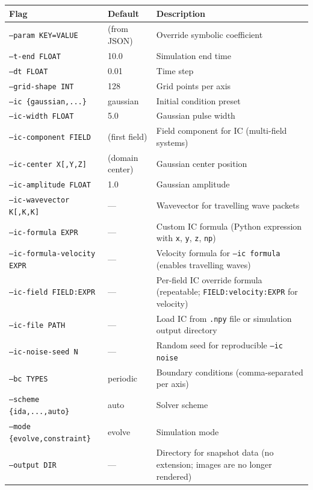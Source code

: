 \begin{table}[htbp]
\centering
\begin{tabular}{@{}llp{4.5cm}@{}}
\toprule
Flag & Default & Description \\
\midrule
\texttt{--param KEY=VALUE}          & (from JSON)       & Override symbolic coefficient \\
\texttt{--t-end FLOAT}             & 10.0              & Simulation end time \\
\texttt{--dt FLOAT}                & 0.01              & Time step \\
\texttt{--grid-shape INT}          & 128               & Grid points per axis \\
\texttt{--ic \{gaussian,...\}}      & gaussian          & Initial condition preset \\
\texttt{--ic-width FLOAT}          & 5.0               & Gaussian pulse width \\
\texttt{--ic-component FIELD}      & (first field)     & Field component for IC (multi-field systems) \\
\texttt{--ic-center X[,Y,Z]}      & (domain center)   & Gaussian center position \\
\texttt{--ic-amplitude FLOAT}      & 1.0               & Gaussian amplitude \\
\texttt{--ic-wavevector K[,K,K]}   & ---               & Wavevector for travelling wave packets \\
\texttt{--ic-formula EXPR}         & ---               & Custom IC formula (Python expression with \texttt{x}, \texttt{y}, \texttt{z}, \texttt{np}) \\
\texttt{--ic-formula-velocity EXPR}& ---               & Velocity formula for \texttt{--ic formula} (enables travelling waves) \\
\texttt{--ic-field FIELD:EXPR}     & ---               & Per-field IC override formula (repeatable; \texttt{FIELD:velocity:EXPR} for velocity) \\
\texttt{--ic-file PATH}            & ---               & Load IC from \texttt{.npy} file or simulation output directory \\
\texttt{--ic-noise-seed N}         & ---               & Random seed for reproducible \texttt{--ic noise} \\
\texttt{--bc TYPES}                & periodic          & Boundary conditions (comma-separated per axis) \\
\texttt{--scheme \{ida,...,auto\}}  & auto              & Solver scheme \\
\texttt{--mode \{evolve,constraint\}}& evolve           & Simulation mode \\
\texttt{--output DIR}              & ---               & Directory for snapshot data (no extension; images are no longer rendered) \\
\bottomrule
\end{tabular}
\end{table}

